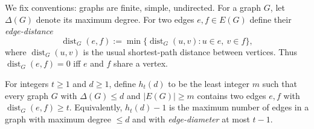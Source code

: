 We fix conventions: graphs are finite, simple, undirected.
For a graph $G$, let $\Delta(G)$ denote its maximum degree.
For two edges $e,f\in E(G)$ define their \emph{edge-distance}
\[
\operatorname{dist}_G(e,f):=\min\{\operatorname{dist}_G(u,v): u\in e,\ v\in f\},
\]
where $\operatorname{dist}_G(u,v)$ is the usual shortest-path distance between vertices.
Thus $\operatorname{dist}_G(e,f)=0$ iff $e$ and $f$ share a vertex.

For integers $t\ge 1$ and $d\ge 1$, define $h_t(d)$ to be the least integer $m$ such that every graph $G$ with $\Delta(G)\le d$ and $|E(G)|\ge m$ contains two edges $e,f$ with $\operatorname{dist}_G(e,f)\ge t$.
Equivalently, $h_t(d)-1$ is the maximum number of edges in a graph with maximum degree $\le d$ and with \emph{edge-diameter} at most $t-1$.
